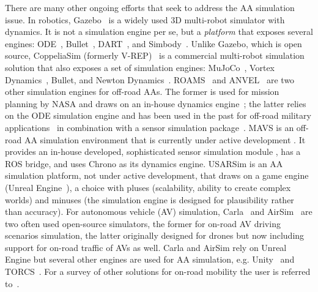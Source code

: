 \documentclass[12pt,twocolumn]{article}
\begin{document}
There are many other ongoing efforts that seek to address the AA simulation issue. In robotics, Gazebo~\cite{gazebo,koenig2004design} is a widely used 3D multi-robot simulator with dynamics.  It is not a simulation engine per se, but a \textit{platform} that exposes several engines: ODE~\cite{ode2015}, Bullet~\cite{bulletPhysicsEngine2020}, DART~\cite{dart2018}, and Simbody~\cite{sherman2011simbody}. Unlike Gazebo, which is open source, CoppeliaSim (formerly V-REP)~\cite{V-REP2013} is a commercial multi-robot simulation solution that also exposes a set of simulation engines: MuJoCo~\cite{todorovMujoco2012}, Vortex Dynamics~\cite{cmLabs2020}, Bullet, and Newton Dynamics~\cite{newtonDynamics2020}. ROAMS~\cite{abhiROAMS2004} and ANVEL~\cite{ANVEL-website} are two other simulation engines for off-road AAs. The former is used for mission planning by NASA and draws on an in-house dynamics engine~\cite{DARTS}; the latter relies on the ODE simulation engine and has been used in the past for off-road military applications~\cite{ANVELdescription2012} in combination with a sensor simulation package~\cite{VANE-2012}. MAVS is an off-road AA simulation environment that is currently under active development \cite{mavsCarruth2018}. It provides an in-house developed, sophisticated sensor simulation module \cite{goodin2018enabling,goodin2019predicting}, has a ROS bridge, and uses Chrono as its dynamics engine. USARSim is an AA simulation platform, not under active development, that draws on a game engine (Unreal Engine~\cite{unrealEngine}), a choice with pluses (scalability, ability to create complex worlds) and minuses (the simulation engine is designed for plausibility rather than accuracy). For autonomous vehicle (AV) simulation, Carla~\cite{carlaAVsim2017} and AirSim~\cite{shah2018airsim} are two often used open-source simulators, the former for on-road AV driving scenarios simulation, the latter originally designed for drones but now including support for on-road traffic of AVs as well. Carla and AirSim rely on Unreal Engine but several other engines are used for AA simulation, e.g. Unity~\cite{unityGaming} and TORCS~\cite{torcsRacingSimulation2020}. For a survey of other solutions for on-road mobility the user is referred to~\cite{surveyAVsimulationBerger2019}.
\end{document}
